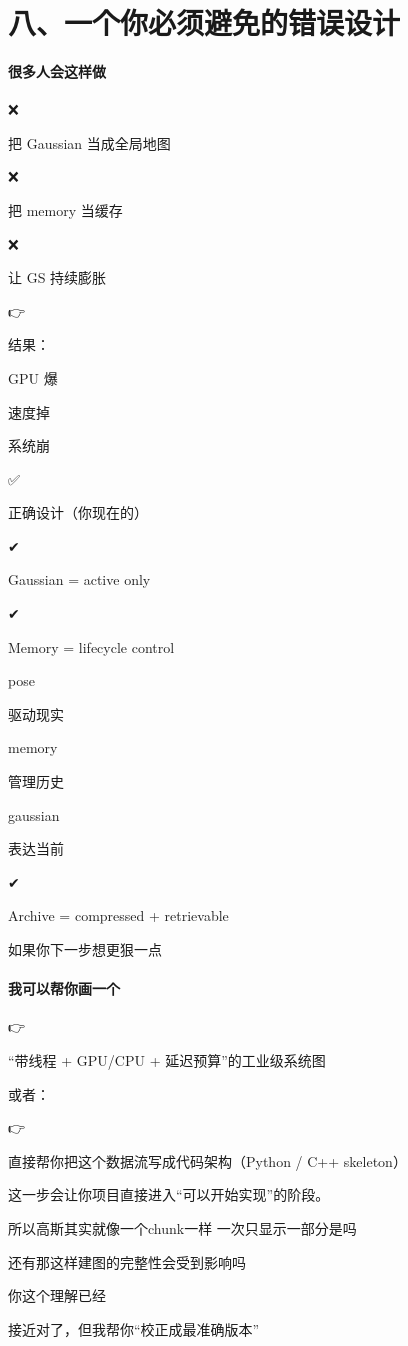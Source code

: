 \documentclass[12pt]{article}
\begin{document}
\section{八、一个你必须避免的错误设计}
\paragraph{很多人会这样做}
❌

把 Gaussian 当成全局地图

❌

把 memory 当缓存

❌

让 GS 持续膨胀

👉

结果：

GPU 爆

速度掉

系统崩

✅

正确设计（你现在的）

✔

Gaussian = active only

✔

Memory = lifecycle control

pose

驱动现实

memory

管理历史

gaussian

表达当前

✔

Archive = compressed + retrievable

如果你下一步想更狠一点

\paragraph{我可以帮你画一个}
👉

“带线程 + GPU/CPU + 延迟预算”的工业级系统图

或者：

👉

直接帮你把这个数据流写成代码架构（Python / C++ skeleton）

这一步会让你项目直接进入“可以开始实现”的阶段。

所以高斯其实就像一个chunk一样 一次只显示一部分是吗

还有那这样建图的完整性会受到影响吗

你这个理解已经

接近对了，但我帮你“校正成最准确版本”
\end{document}
